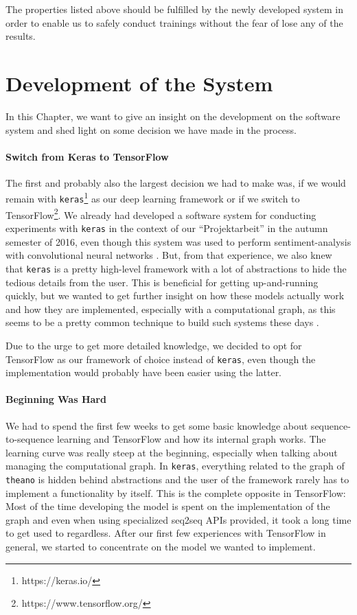 The properties listed above should be fulfilled by the newly developed system in order to enable us to safely conduct trainings without the fear of lose any of the results.

\section{Development of the System}
\label{software_system:development_history}
In this Chapter, we want to give an insight on the development on the software system and shed light on some decision we have made in the process.

\paragraph{Switch from Keras to TensorFlow} The first and probably also the largest decision we had to make was, if we would remain with \texttt{keras}\footnote{https://keras.io/} as our deep learning framework or if we switch to TensorFlow\footnote{https://www.tensorflow.org/}. We already had developed a software system for conducting experiments with \texttt{keras} in the context of our ``Projektarbeit'' in the autumn semester of 2016, even though this system was used to perform sentiment-analysis with convolutional neural networks \cite{Vongruenigen:2017}. But, from that experience, we also knew that \texttt{keras} is a pretty high-level framework with a lot of abstractions to hide the tedious details from the user. This is beneficial for getting up-and-running quickly, but we wanted to get further insight on how these models actually work and how they are implemented, especially with a computational graph, as this seems to be a pretty common technique to build such systems these days \cite{TensorFlow:2015}\cite{Theano:2016}\cite{Torch:2011}.

Due to the urge to get more detailed knowledge, we decided to opt for TensorFlow as our framework of choice instead of \texttt{keras}, even though the implementation would probably have been easier using the latter.
\paragraph{Beginning Was Hard} We had to spend the first few weeks to get some basic knowledge about sequence-to-sequence learning and TensorFlow and how its internal graph works. The learning curve was really steep at the beginning, especially when talking about managing the computational graph. In \texttt{keras}, everything related to the graph of \texttt{theano} is hidden behind abstractions and the user of the framework rarely has to implement a functionality by itself. This is the complete opposite in TensorFlow: Most of the time developing the model is spent on the implementation of the graph and even when using specialized seq2seq APIs provided, it took a long time to get used to regardless. After our first few experiences with TensorFlow in general, we started to concentrate on the model we wanted to implement.


